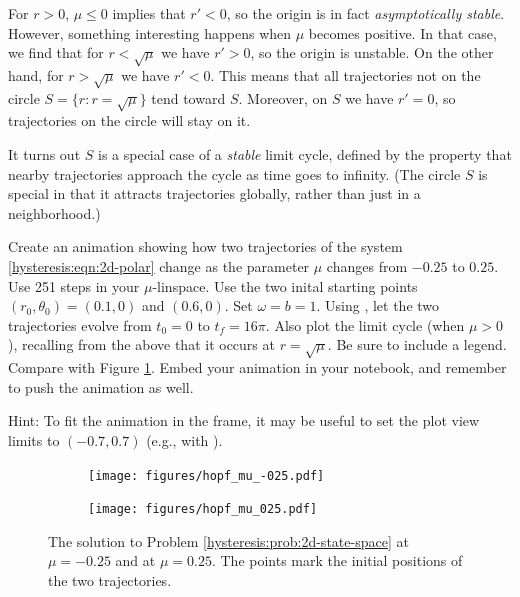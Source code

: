 For $r > 0$, $\mu \le 0$ implies that $r' < 0$, so the origin is in fact \emph{asymptotically stable}.
However, something interesting happens when $\mu$ becomes positive.
In that case, we find that for $r < \sqrt \mu$ we have $r' > 0$, so the origin is unstable.
On the other hand, for $r > \sqrt \mu$ we have $r' < 0$.
This means that all trajectories not on the circle $S = \{r : r = \sqrt \mu\}$ tend toward $S$.
Moreover, on $S$ we have $r' = 0$, so trajectories on the circle will stay on it.

It turns out $S$ is a special case of a \emph{stable} limit cycle, defined by the property that nearby trajectories approach the cycle as time goes to infinity.
(The circle $S$ is special in that it attracts trajectories globally, rather than just in a neighborhood.)

\begin{problem}
    \label{hysteresis:prob:2d-state-space}
    Create an animation showing how two trajectories of the system \eqref{hysteresis:eqn:2d-polar} change as the parameter $\mu$ changes from $-0.25$ to $0.25$.
    Use 251 steps in your $\mu$-linspace.
    Use the two inital starting points $(r_0, \theta_0) = (0.1, 0)$ and $(0.6, 0)$.
    Set $\omega = b = 1$.
    Using , let the two trajectories evolve from $t_0 = 0$ to $t_f = 16 \pi$.
    Also plot the limit cycle (when $\mu > 0$), recalling from the above that it occurs at $r = \sqrt \mu$.
    Be sure to include a legend.
    Compare with Figure \ref{hysteresis:fig:2d-state-space}.
    Embed your animation in your notebook, and remember to push the animation as well.

    \noindent Hint: To fit the animation in the frame, it may be useful to set the plot view limits to $(-0.7, 0.7)$ (e.g., with ).
\end{problem}

\begin{figure}
    \begin{subfigure}[b]{0.49\textwidth}
        \centering
        \texttt{[image: figures/hopf\_mu\_-025.pdf]}
    \end{subfigure}
    \begin{subfigure}[b]{0.49\textwidth}
        \centering
        \texttt{[image: figures/hopf\_mu\_025.pdf]}
    \end{subfigure}
    \caption{The solution to Problem \ref{hysteresis:prob:2d-state-space} at $\mu = -0.25$ and at $\mu = 0.25$. The points mark the initial positions of the two trajectories.}
    \label{hysteresis:fig:2d-state-space}
\end{figure}

